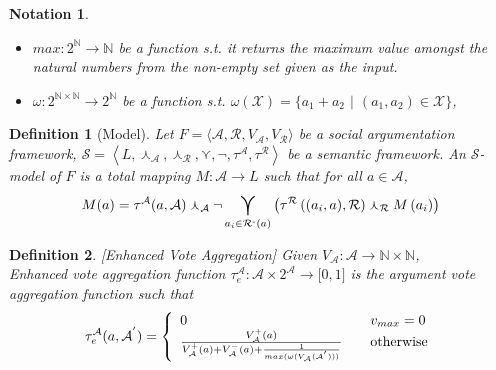 \documentclass{article}
\newtheorem{definition}{Definition}
\newtheorem{notation}{Notation}
\newcommand{\nat}{\mathbb{N}}   %
\newcommand{\args}{\mathcal{A}} %
\newcommand{\att}{\mathcal{R}}  %
\newcommand{\valueset}{L}
\newcommand{\varg}{V_{\args}}   %
\newcommand{\vargpro}[1]{\varg^+\left(#1\right)} %
\newcommand{\vargcon}[1]{\varg^-\left(#1\right)} %
\newcommand{\vatt}{V_{\att}}   %
\newcommand{\attackers}[1]{\att^\text{-}\left(#1\right)}
\newcommand{\safid}{F}               %
\newcommand{\saf}{\safid = \safbody} %
\newcommand{\safbody}{\langle \args, \att, \varg, \vatt \rangle} %
\newcommand{\semid}{\mathcal{S}}        %
\newcommand{\sembodyNew}{\left\langle \valueset,\SAFand_\mathcal{A}, \SAFand_\mathcal{R}, \SAFor, \lnot, \tau^{\args}, \tau^{\att}\right\rangle} %
\newcommand{\SAFand}{\curlywedge}     %
\newcommand{\SAFor}{\curlyvee}        %
\DeclareMathOperator*{\SAFOr}{\bigcurlyvee} %
\newcommand{\sem}{\mathcal{S}}
\begin{document}
\begin{notation}
\begin{itemize}
\item $max: 2^{\nat} \to \nat$ be a function s.t. it returns the maximum value amongst the natural numbers from the non-empty set given as the input.

\item $\omega:  2^{\nat \times \nat} \to 2^{\nat}$ be a function s.t. $\omega(\mathcal{X}) = \{a_{1}+a_{2}$ $|$ $(a_{1}, a_{2}) \in \mathcal{X}\}$,

\end{itemize}
\end{notation}

\begin{definition}[Model] 
\label{def:model}
  Let $\saf$ be a social argumentation framework, $\sem = \sembodyNew$ be a semantic framework. An $\semid$-model of $\safid$ is a total mapping $M : \args \rightarrow \valueset$ such that for all $a \in \args$,
  $$\displaystyle M(a) = \tau^\args(a, \args ) \SAFand_\args \lnot \SAFOr_{a_i \in \attackers{a}} \left(\tau^\att\left((a_i, a), \att \right) \SAFand_\att M\left(a_i\right)\right)$$
\end{definition}


\begin{definition}
\label{def:enhVoteAgg}
[Enhanced Vote Aggregation]
 Given $\varg : \args \to \nat \times \nat$, \\Enhanced vote aggregation function
$\tau^\args_{e}: \args \times {2}^{\args} \rightarrow\lbrack0,1]$ is the argument vote aggregation function such that
\[
\tau^\args_{e}  (a, \mathcal{A}^{'})  = \left\{
\begin{array}
[c]{lll}
0 &  & v_{max}=0\\
\frac{\vargpro a}{\vargpro a + \vargcon a+\frac{1}{max(\omega(\varg (\mathcal{A}^{'})))}} &  & \text{otherwise}%
\end{array}
\right.
\]
\end{definition}


\newpage
\end{document}
